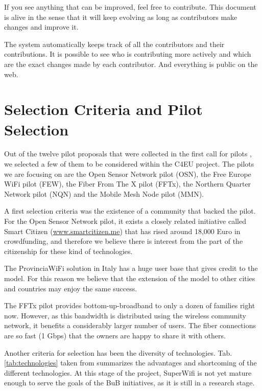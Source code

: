 \documentclass[draftclsnofoot,12pt,journal,onecolumn]{IEEEtran}
\begin{document}
If you see anything that can be improved, feel free to contribute.
This document is alive in the sense that it will keep evolving as long as contributors make changes and improve it.

The system automatically keeps track of all the contributors and their contributions. 
It is possible to see who is contributing more actively and which are the exact changes made by each contributor.
And everything is public on the web.

\section{Selection Criteria and Pilot Selection}
\label{sec:selection}

Out of the twelve pilot proposals that were collected in the first call for pilots \cite{barcelo2012bub}, we selected a few of them to be considered within the C4EU project.
The pilots we are focusing on are the Open Sensor Network pilot (OSN), the Free Europe WiFi pilot (FEW), the Fiber From The X pilot (FFTx), the Northern Quarter Network pilot (NQN) and the Mobile Mesh Node pilot (MMN).

A first selection criteria was the existence of a community that backed the pilot.
For the Open Sensor Network pilot, it exists a closely related initiative called Smart Citizen (\url{www.smartcitizen.me}) that has rised around 18,000 Euro in crowdfunding, and therefore we believe there is interest from the part of the citizenship for these kind of technologies.

The ProvinciaWiFi solution in Italy has a huge user base that gives credit to the model.
For this reason we believe that the extension of the model to other cities and countries may enjoy the same success.

The FFTx pilot provides bottom-up-broadband to only a dozen of families right now.
However, as this bandwidth is distributed using the wireless community network, it benefits a considerably larger number of users.
The fiber connections are so fast (1 Gbps) that the owners are happy to share it with others.

Another criteria for selection has been the diversity of technologies.
Tab. \ref{tab:technologies} taken from \cite{barcelo2012bub} summarizes the advantages and shortcoming of the different technologies.
At this stage of the project, SuperWifi is not yet mature enough to serve the goals of the BuB initiatives, as it is still in a research stage.
\end{document}
